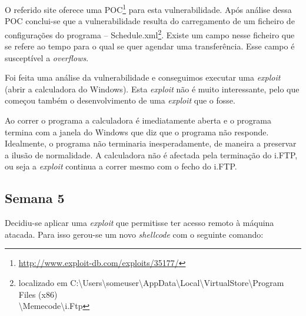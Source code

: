 \documentclass[11pt,a4paper]{article}
\begin{document}
O referido site oferece uma POC\footnote{\url{http://www.exploit-db.com/exploits/35177/}} para esta vulnerabilidade. Após análise dessa POC conclui-se que a vulnerabilidade resulta do carregamento de um ficheiro de configurações do programa -- Schedule.xml\footnote{localizado em C:\textbackslash Users\textbackslash someuser\textbackslash AppData\textbackslash Local\textbackslash VirtualStore\textbackslash Program Files (x86)\\ \textbackslash Memecode\textbackslash i.Ftp}. Existe um campo nesse ficheiro que se refere ao tempo para o qual se quer agendar uma transferência. Esse campo é susceptível a \textit{overflows}.

Foi feita uma análise da vulnerabilidade e conseguimos executar uma \textit{exploit} (abrir a calculadora do Windows). Esta \textit{exploit} não é muito interessante, pelo que começou também o desenvolvimento de uma \textit{exploit} que o fosse.

Ao correr o programa a calculadora é imediatamente aberta e o programa termina com a janela do Windows que diz que o programa não responde. Idealmente, o programa não terminaria inesperadamente, de maneira a preservar a ilusão de normalidade. A calculadora não é afectada pela terminação do i.FTP, ou seja a \textit{exploit} continua a correr mesmo com o fecho do i.FTP.


\subsection{Semana 5}

Decidiu-se aplicar uma \textit{exploit} que permitisse ter acesso remoto à máquina atacada. Para isso gerou-se um novo \textit{shellcode} com o seguinte comando:
\end{document}
